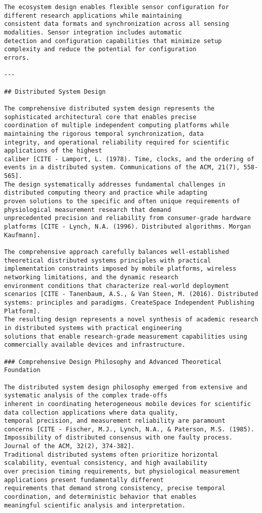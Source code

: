 \documentclass[11pt,a4paper]{report}
\begin{document}
\begin{verbatim}
The ecosystem design enables flexible sensor configuration for different research applications while maintaining
consistent data formats and synchronization across all sensing modalities. Sensor integration includes automatic
detection and configuration capabilities that minimize setup complexity and reduce the potential for configuration
errors.

---

## Distributed System Design

The comprehensive distributed system design represents the sophisticated architectural core that enables precise
coordination of multiple independent computing platforms while maintaining the rigorous temporal synchronization, data
integrity, and operational reliability required for scientific applications of the highest
caliber [CITE - Lamport, L. (1978). Time, clocks, and the ordering of events in a distributed system. Communications of the ACM, 21(7), 558-565].
The design systematically addresses fundamental challenges in distributed computing theory and practice while adapting
proven solutions to the specific and often unique requirements of physiological measurement research that demand
unprecedented precision and reliability from consumer-grade hardware
platforms [CITE - Lynch, N.A. (1996). Distributed algorithms. Morgan Kaufmann].

The comprehensive approach carefully balances well-established theoretical distributed systems principles with practical
implementation constraints imposed by mobile platforms, wireless networking limitations, and the dynamic research
environment conditions that characterize real-world deployment
scenarios [CITE - Tanenbaum, A.S., & Van Steen, M. (2016). Distributed systems: principles and paradigms. CreateSpace Independent Publishing Platform].
The resulting design represents a novel synthesis of academic research in distributed systems with practical engineering
solutions that enable research-grade measurement capabilities using commercially available devices and infrastructure.

### Comprehensive Design Philosophy and Advanced Theoretical Foundation

The distributed system design philosophy emerged from extensive and systematic analysis of the complex trade-offs
inherent in coordinating heterogeneous mobile devices for scientific data collection applications where data quality,
temporal precision, and measurement reliability are paramount
concerns [CITE - Fischer, M.J., Lynch, N.A., & Paterson, M.S. (1985). Impossibility of distributed consensus with one faulty process. Journal of the ACM, 32(2), 374-382].
Traditional distributed systems often prioritize horizontal scalability, eventual consistency, and high availability
over precision timing requirements, but physiological measurement applications present fundamentally different
requirements that demand strong consistency, precise temporal coordination, and deterministic behavior that enables
meaningful scientific analysis and interpretation.


\end{verbatim}
\end{document}
